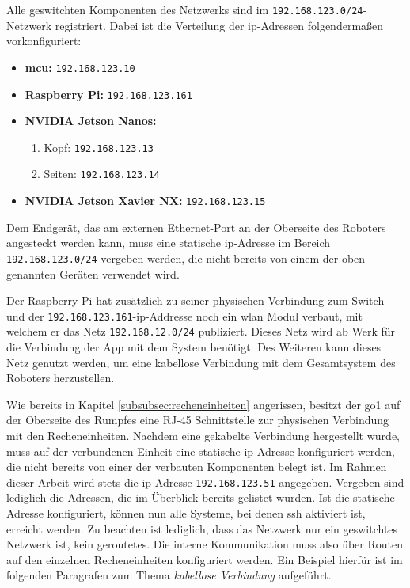 Alle geswitchten Komponenten des Netzwerks sind im \texttt{192.168.123.0/24}-Netzwerk registriert.
Dabei ist die Verteilung der \gls{ip}-Adressen folgendermaßen vorkonfiguriert:
\begin{itemize}
    \item \textbf{\gls{mcu}:} \texttt{192.168.123.10}
    \item \textbf{Raspberry Pi:} \texttt{192.168.123.161}
    \item \textbf{NVIDIA Jetson Nanos:}
    \begin{enumerate}
        \item Kopf: \texttt{192.168.123.13}
        \item Seiten: \texttt{192.168.123.14}
    \end{enumerate}
    \item \textbf{NVIDIA Jetson Xavier NX:} \texttt{192.168.123.15}
\end{itemize}
Dem Endgerät, das am externen Ethernet-Port an der Oberseite des Roboters angesteckt werden kann,
muss eine statische \gls{ip}-Adresse im Bereich \texttt{192.168.123.0/24} vergeben werden, die nicht bereits von einem der oben genannten
Geräten verwendet wird.

Der Raspberry Pi hat zusätzlich zu seiner physischen Verbindung zum Switch und der \texttt{192.168.123.161}-\gls{ip}-Addresse
noch ein \gls{wlan} Modul verbaut, mit welchem er das Netz \texttt{192.168.12.0/24} publiziert.
Dieses Netz wird ab Werk für die Verbindung der App mit dem System benötigt.
Des Weiteren kann dieses Netz genutzt werden, um eine kabellose Verbindung mit dem Gesamtsystem
des Roboters herzustellen.


Wie bereits in Kapitel \ref{subsubsec:recheneinheiten} angerissen, besitzt der \gls{go1} auf der Oberseite des Rumpfes
eine RJ-45 Schnittstelle zur physischen Verbindung mit den Recheneinheiten.
Nachdem eine gekabelte Verbindung hergestellt wurde, muss auf der verbundenen Einheit eine statische \gls{ip} Adresse
konfiguriert werden, die nicht bereits von einer der verbauten Komponenten belegt ist.
Im Rahmen dieser Arbeit wird stets die \gls{ip} Adresse \texttt{192.168.123.51} angegeben.
Vergeben sind lediglich die Adressen, die im Überblick bereits gelistet wurden.
Ist die statische Adresse konfiguriert, können nun alle Systeme, bei denen \gls{ssh} aktiviert ist, erreicht werden.
Zu beachten ist lediglich, dass das Netzwerk nur ein geswitchtes Netzwerk ist, kein geroutetes.
Die interne Kommunikation muss also über Routen auf den einzelnen Recheneinheiten konfiguriert werden.
Ein Beispiel hierfür ist im folgenden Paragrafen zum Thema \emph{kabellose Verbindung} aufgeführt.

